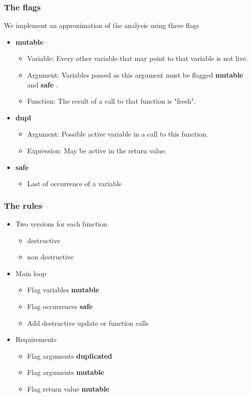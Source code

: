 \documentclass{beamer}
\newcommand{\bang}{\textbf{mutable }}
\newcommand{\safe}{\textbf{safe }}
\newcommand{\dupl}{\textbf{duplicated }}
\begin{document}
\begin{frame}
\frametitle{The flags}
We implement an approximation of the analysis using three flags
\begin{itemize}
\itemsep1.5em
\item \bang
\begin{itemize}
\item Variable: Every other variable that may point to that variable is not live.
\item Argument: Variables passed as this argument must be flagged \bang and \safe.
\item Function: The result of a call to that function is "fresh".
\end{itemize}
\item \textbf{dupl}
\begin{itemize}
\item Argument: Possible active variable in a call to this function.
\item Expression: May be active in the return value.
\end{itemize}
\item \textbf{safe}
\begin{itemize}
\item Last of occurrence of a variable
\end{itemize}
\end{itemize}

\end{frame}


\begin{frame}
\frametitle{The rules}
\begin{itemize}
\itemsep1em
\item Two versions for each function
\begin{itemize}
\item destructive
\item non destructive
\end{itemize}
\item Main loop
\begin{itemize}
\itemsep0em
\item Flag variables \bang
\item Flag occurrences \safe
\item Add destructive update or function calls
\end{itemize}
\item Requirements
\begin{itemize}
\itemsep0em
\item Flag arguments \dupl
\item Flag arguments \bang
\item Flag return value \bang
\end{itemize}
\end{itemize}
\end{frame}
\end{document}
